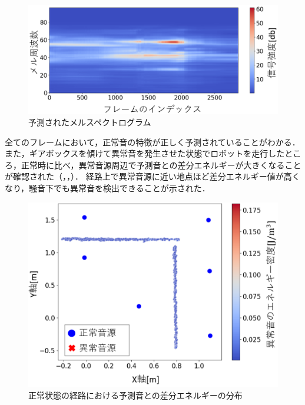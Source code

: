 \documentclass{/workdir/classes/summary}
\begin{document}
\begin{figure}[t]
  \centering
  \includegraphics[keepaspectratio, width=1.0\linewidth]{predicted_mel.png}
  \caption{予測されたメルスペクトログラム}
  \label{fig:predicted_mel}
\end{figure}
全てのフレームにおいて，正常音の特徴が正しく予測されていることがわかる．
また，ギアボックスを傾けて異常音を発生させた状態でロボットを走行したところ，正常時に比べ，異常音源周辺で予測音との差分エネルギーが大きくなることが確認された（，，）．
経路上で異常音源に近い地点ほど差分エネルギー値が高くなり，騒音下でも異常音を検出できることが示された．
\begin{figure}[t]
  \centering
  \includegraphics[keepaspectratio, width=1.0\linewidth]{lab_normal.png}
  \caption{正常状態の経路における予測音との差分エネルギーの分布}
  \label{fig:lab_normal}
\end{figure}
\end{document}
